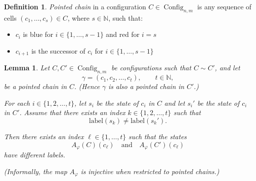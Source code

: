 \documentclass{article}
\theoremstyle{plain}
\newtheorem{lemma}[theorem]{Lemma}
\theoremstyle{definition}
\newtheorem{definition}[theorem]{Definition}
\DeclareMathOperator{\Config}{Config}
\begin{document}
\begin{definition}
    \emph{Pointed chain}  in a configuration $C \in \Config_{n,m}$ is any sequence of cells $(c_1, \dots, c_s) \in C$, where $s \in \mathbb{N}$, such that:
    \begin{itemize}
        \item $c_i$ is blue for $i \in \{1, \dots, s-1\}$ and red for $i=s$
        \item $c_{i+1}$ is the successor of $c_{i}$ for $i \in \{1, \dots, s-1\}$
    \end{itemize}
\end{definition}


\begin{lemma}\label{lm:global_injective}
Let $C, C' \in \Config_{n,m}$ be configurations such that $C \sim C'$, and let
\[
\gamma = (c_1, c_2, \dots, c_t), \qquad t \in \mathbb{N},
\]
be a pointed chain in $C$. (Hence $\gamma$ is also a pointed chain in $C'$.)

For each $i \in \{1,2,\dots,t\}$, let $s_i$ be the state of $c_i$ in $C$ and
let $s_i'$ be the state of $c_i$ in $C'$.  
Assume that there exists an index $k \in \{1,2,\dots,t\}$ such that
\[
\mathrm{label}(s_k) \neq \mathrm{label}(s_k').
\]

Then there exists an index $\ell \in \{1,\dots,t\}$ such that the states 
\[
A_{\varphi}(C)(c_\ell)
\quad\text{and}\quad
A_{\varphi}(C')(c_\ell)
\]
have different labels.

(Informally, the map $A_{\varphi}$ is injective when restricted to pointed chains.)
\end{lemma}
\end{document}
